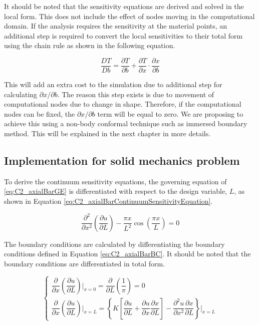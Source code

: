 It should be noted that the sensitivity equations are derived and solved in the local form. This does not include the effect of nodes moving in the computational domain. If the analysis requires the sensitivity at the material points, an additional step is required to convert the local sensitivities to their total form using the chain rule as shown in the following equation.

\begin{equation*}
	\frac{DT}{Db} = \frac{\partial T}{\partial b} + \frac{\partial T}{\partial x} \cdot \frac{\partial x}{\partial b}
\end{equation*}

This will add an extra cost to the simulation due to additional step for calculating $\partial x/\partial b$. The reason this step exists is due to movement of computational nodes due to change in shape. Therefore, if the computational nodes can be fixed, the $\partial x/\partial b$ term will be equal to zero. We are proposing to achieve this using a non-body conformal technique such as immersed boundary method. This will be explained in the next chapter in more details.

\subsection{Implementation for solid mechanics problem}
To derive the continuum sensitivity equations, the governing equation of \eqref{eq:C2_axialBarGE} is differentiated with respect to the design variable, $L$, as shown in Equation \eqref{eq:C2_axialBarContinuumSensitivityEquation}.

\begin{equation}\label{eq:C2_axialBarContinuumSensitivityEquation}
	\frac{\partial^2}{\partial x^2} \left( \frac{\partial u}{\partial L} \right) - 
	\frac{\pi x}{L^2} \cos \left( \frac{\pi x}{L} \right) = 0
\end{equation}

The boundary conditions are calculated by differentiating the boundary conditions defined in Equation \eqref{eq:C2_axialBarBC}. It should be noted that the boundary conditions are differentiated in total form.

\begin{equation}\label{eq:C2_axialBarContinuumSensitivityBoundaryConditions}
	\begin{cases}
	\dfrac{\partial}{\partial x} \left( \dfrac{\partial u}{\partial L} \right) \bigg|_{x = 0} = 
	\dfrac{\partial }{\partial L} \left( \dfrac{1}{\pi} \right) = 0
	\\
	\dfrac{\partial}{\partial x} \left( \dfrac{\partial u}{\partial L} \right) \bigg|_{x = L} = 
	\left\{
	K \left[ \dfrac{\partial u}{\partial L} + \dfrac{\partial u}{\partial x} \dfrac{\partial x}{\partial L} \right] - 
	\dfrac{\partial^2 u}{\partial x^2} \dfrac{\partial x}{\partial L}
	\right\} \bigg|_{x = L}
	\end{cases}
\end{equation}

